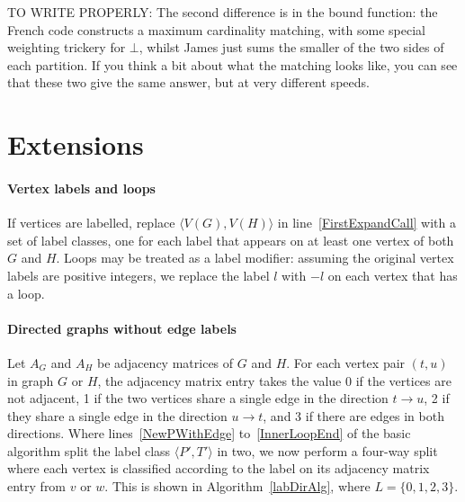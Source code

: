 \documentclass[letterpaper]{article}
\newcommand{\lineref}[1]{line~\ref{#1}}
\newcommand{\linerangeref}[2]{lines~\ref{#1} to~\ref{#2}}
\begin{document}
TO WRITE PROPERLY: The second difference is in the bound function: the French
code constructs a maximum cardinality matching, with some special weighting
trickery for $\bot$, whilst James just sums the smaller of the two sides of
each partition. If you think a bit about what the matching looks like, you can
see that these two give the same answer, but at very different speeds.

\section{Extensions}\label{sec:extensions}

\paragraph{Vertex labels and loops} If vertices are labelled, replace ${\langle
V(G),V(H) \rangle}$ in \lineref{FirstExpandCall} with a set of label classes,
one for each label that appears on at least one vertex of both $G$ and $H$.
Loops may be treated as a label modifier: assuming the original vertex labels
are positive integers, we replace the label $l$ with $-l$ on each vertex that
has a loop.

\paragraph{Directed graphs without edge labels} Let $A_G$ and $A_H$ be
adjacency matrices of $G$ and $H$. For each vertex pair $(t,u)$ in graph $G$ or
$H$, the adjacency matrix entry takes the value 0 if the vertices are not
adjacent, 1 if the two vertices share a single edge in the direction $t
\rightarrow u$, 2 if they share a single edge in the direction $u \rightarrow
t$, and 3 if there are edges in both directions. Where
\linerangeref{NewPWithEdge}{InnerLoopEnd} of the basic algorithm split the
label class $\langle P',T' \rangle$ in two, we now perform a four-way split
where each vertex is classified according to the label on its adjacency matrix
entry from $v$ or $w$.  This is shown in Algorithm~\ref{labDirAlg}, where
$L=\{0,1,2,3\}$.

\begin{algorithm}
\DontPrintSemicolon
\nl    {}
\caption{Replacement for \linerangeref{NewPWithEdge}{InnerLoopEnd} in directed and labelled cases}
\label{labDirAlg}
\end{algorithm}
\end{document}
